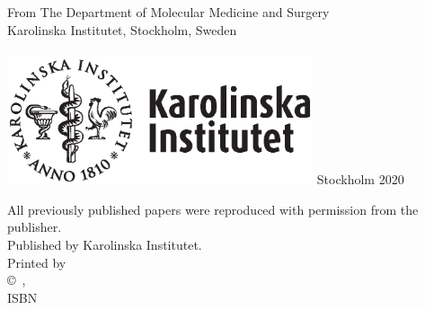 \frontmatter %

\vfill
\begin{center}
{From The Department of Molecular Medicine and Surgery\\
Karolinska Institutet, Stockholm, Sweden}
\\[2mm]
\vfill
{\huge \myMainTitle}
\\[10mm]
{\large \myName}
\vfill
\includegraphics[width=90mm]{img/KI-Logo_pos.eps}
\vfill
Stockholm 2020\\
\end{center}
\vfill

\clearpage
\thispagestyle{empty} %
\vspace*{\fill}
{\ssmall All previously published papers were reproduced with permission from the publisher.\\
Published by Karolinska Institutet.\\
Printed by \thePrinter\\
\copyright~\myName,~\myCopyrightYear\\
ISBN \myISBNprint}

